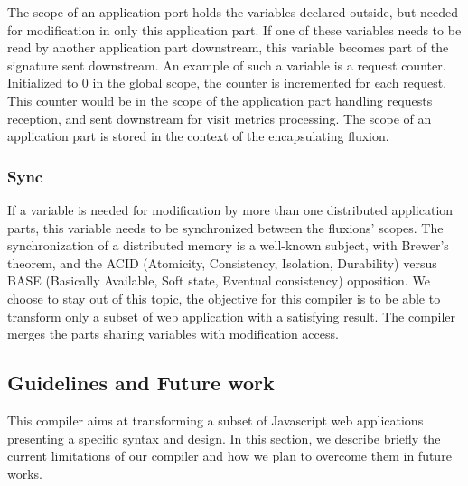 The scope of an application port holds the variables declared outside, but needed for modification in only this application part.
If one of these variables needs to be read by another application part downstream, this variable becomes part of the signature sent downstream.
An example of such a variable is a request counter. Initialized to 0 in the global scope, the counter is incremented for each request.
This counter would be in the scope of the application part handling requests reception, and sent downstream for visit metrics processing.
The scope of an application part is stored in the context of the encapsulating fluxion.

\subsubsection{Sync}

If a variable is needed for modification by more than one distributed application parts, this variable needs to be synchronized between the fluxions' scopes.
The synchronization of a distributed memory is a well-known subject, with Brewer's theorem\cite{Gilbert2002}\cite{codahale2010}, and the ACID (Atomicity, Consistency, Isolation, Durability) versus BASE (Basically Available, Soft state, Eventual consistency) opposition\cite{Fox1997}.
We choose to stay out of this topic, the objective for this compiler is to be able to transform only a subset of web application with a satisfying result.
The compiler merges the parts sharing variables with modification access.

\subsection{Guidelines and Future work}

This compiler aims at transforming a subset of Javascript web applications presenting a specific syntax and design.
In this section, we describe briefly the current limitations of our compiler and how we plan to overcome them in future works.

